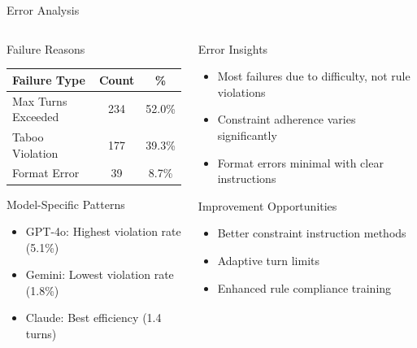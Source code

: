 \documentclass[aspectratio=169]{beamer}
\begin{document}
\begin{frame}{Error Analysis}
\begin{columns}[c]
\begin{column}{0.5\textwidth}
\begin{block}{Failure Reasons}
\begin{center}
\begin{tabular}{lcc}
\toprule
\textbf{Failure Type} & \textbf{Count} & \textbf{\%} \\
\midrule
Max Turns Exceeded & 234 & 52.0\% \\
Taboo Violation & 177 & 39.3\% \\
Format Error & 39 & 8.7\% \\
\bottomrule
\end{tabular}
\end{center}
\end{block}

\begin{block}{Model-Specific Patterns}
\begin{itemize}
    \item GPT-4o: Highest violation rate (5.1\%)
    \item Gemini: Lowest violation rate (1.8\%)
    \item Claude: Best efficiency (1.4 turns)
\end{itemize}
\end{block}
\end{column}

\begin{column}{0.48\textwidth}
\begin{block}{Error Insights}
\begin{itemize}
    \item Most failures due to difficulty, not rule violations
    \item Constraint adherence varies significantly
    \item Format errors minimal with clear instructions
\end{itemize}
\end{block}

\begin{block}{Improvement Opportunities}
\begin{itemize}
    \item Better constraint instruction methods
    \item Adaptive turn limits
    \item Enhanced rule compliance training
\end{itemize}
\end{block}
\end{column}
\end{columns}
\end{frame}
\end{document}
